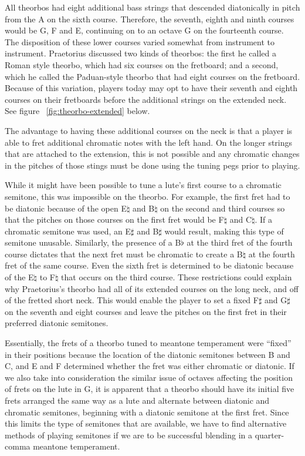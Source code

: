 All theorbos had eight additional bass strings that descended diatonically in
pitch from the A on the sixth course.  Therefore, the seventh, eighth and ninth
courses would be G, F and E, continuing on to an octave G on the fourteenth
course.  The disposition of these lower courses varied somewhat from instrument
to instrument.  Praetorius discussed two kinds of theorbos: the first he called
a Roman style theorbo, which had six courses on the fretboard; and a second,
which he called the Paduan-style theorbo that had eight courses on the
fretboard. \autocite[59]{MP:1}  Because of this variation, players today may
opt to have their seventh and eighth courses on their fretboards before the
additional strings on the extended neck. See figure ~\ref{fig:theorbo-extended}
below.

The advantage to having these additional courses on the neck is that a player is
able to fret additional chromatic notes with the left hand.  On the longer
strings that are attached to the extension, this is not possible and any
chromatic changes in the pitches of those stings must be done using the tuning
pegs prior to playing.

While it might have been possible to tune a lute's first course to a chromatic semitone,
this was impossible on the theorbo. For example, the first fret had to be diatonic because
of the open E$\natural$ and B$\natural$ on the second and third courses so that the
pitches on those courses on the first fret would be F$\natural$ and C$\natural$.  If a
chromatic semitone was used, an E$\sharp$ and B$\sharp$ would result, making this type of
semitone unusable. Similarly, the presence of a B$\flat$ at the third fret of the fourth
course dictates that the next fret must be chromatic to create a B$\natural$ at the fourth
fret of the same course. Even the sixth fret is determined to be diatonic because of the
E$\natural$ to F$\natural$ that occurs on the third course.  These restrictions could
explain why Praetorius's theorbo had all of its extended courses on the long neck, and
off of the fretted short neck.  This would enable the player to set a fixed F$\sharp$ and 
G$\sharp$ on the seventh and eight courses and leave the pitches on the first fret in
their preferred diatonic semitones. 

Essentially, the frets of a theorbo tuned to meantone temperament were ``fixed'' in
their positions because the location of the diatonic semitones between B and C, and E
and F determined whether the fret was either chromatic or diatonic.  If we also take into
consideration the similar issue of octaves affecting the position of frets on the lute
in G, it is apparent that a theorbo should have its initial five frets arranged the
same way as a lute and alternate between diatonic and chromatic semitones, beginning
with a diatonic semitone at the first fret.  Since this limits the type of semitones
that are available, we have to find alternative methods of playing semitones if we are
to be successful blending in a quarter-comma meantone temperament.

